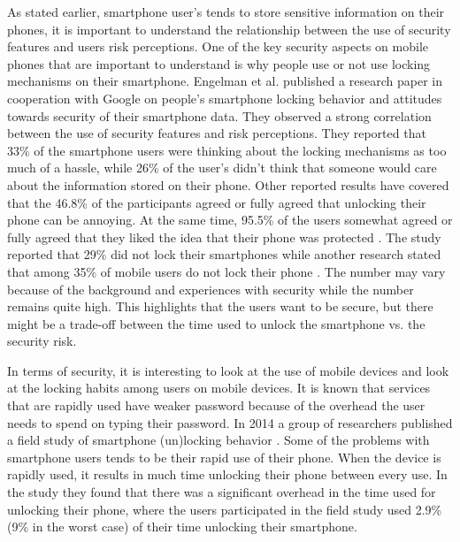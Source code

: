   As stated earlier, smartphone user's tends to store sensitive information on their phones, it is important to understand the relationship between the use of security features and users risk perceptions. One of the key security aspects on mobile phones that are important to understand is why people use or not use locking mechanisms on their smartphone. Engelman et al. \cite{Egelman} published a research paper in cooperation with Google on people's smartphone locking behavior and attitudes towards security of their smartphone data. They observed a strong correlation between the use of security features and risk perceptions. They reported that 33\% of the smartphone users were thinking about the locking mechanisms as too much of a hassle, while 26\% of the user's didn't think that someone would care about the information stored on their phone. Other reported results have covered that the 46.8\% of the participants agreed or fully agreed that unlocking their phone can be annoying. At the same time, 95.5\% of the users somewhat agreed or fully agreed that they liked the idea that their phone was protected \cite{habits3}. The study reported that 29\% did not lock their smartphones \cite{MobileUseage} while another research stated that among 35\% of mobile users do not lock their phone \cite{Bruggen}. The number may vary because of the background and experiences with security while the number remains quite high. This highlights that the users want to be secure, but there might be a trade-off between the time used to unlock the smartphone vs. the security risk. 

  In terms of security, it is interesting to look at the use of mobile devices and look at the locking habits among users on mobile devices. It is known that services that are rapidly used have weaker password because of the overhead the user needs to spend on typing their password. In 2014 a group of researchers published a field study of smartphone (un)locking behavior \cite{habits3}. Some of the problems with smartphone users tends to be their rapid use of their phone. When the device is rapidly used, it results in much time unlocking their phone between every use. In the study they found that there was a significant overhead in the time used for unlocking their phone, where the users participated in the field study used 2.9\% (9\% in the worst case) of their time unlocking their smartphone.

